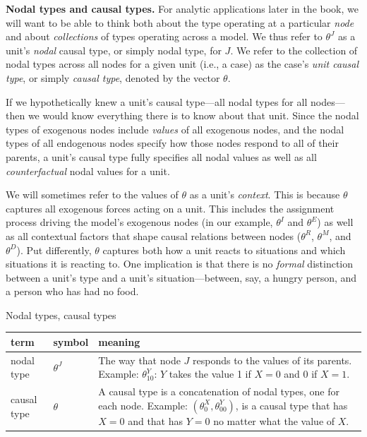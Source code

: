 \documentclass[
  12pt,
]{book}
\begin{document}
\textbf{Nodal types and causal types.} For analytic applications later in the book, we will want to be able to think both about the type operating at a particular \emph{node} and about \emph{collections} of types operating across a model. We thus refer to \(\theta^J\) as a unit's \emph{nodal} causal type, or simply nodal type, for \(J\). We refer to the collection of nodal types across all nodes for a given unit (i.e., a case) as the case's \emph{unit causal type}, or simply \emph{causal type}, denoted by the vector \(\theta\).

If we hypothetically knew a unit's causal type---all nodal types for all nodes---then we would know everything there is to know about that unit. Since the nodal types of exogenous nodes include \emph{values} of all exogenous nodes, and the nodal types of all endogenous nodes specify how those nodes respond to all of their parents, a unit's causal type fully specifies all nodal values as well as all \emph{counterfactual} nodal values for a unit.

We will sometimes refer to the values of \(\theta\) as a unit's \emph{context}. This is because \(\theta\) captures all exogenous forces acting on a unit. This includes the assignment process driving the model's exogenous nodes (in our example, \(\theta^I\) and \(\theta^E\)) as well as all contextual factors that shape causal relations between nodes (\(\theta^R\), \(\theta^M\), and \(\theta^D\)). Put differently, \(\theta\) captures both how a unit reacts to situations and which situations it is reacting to. One implication is that there is no \emph{formal} distinction between a unit's type and a unit's situation---between, say, a hungry person, and a person who has had no food.

Nodal types, causal types

\begin{longtable}[]{@{}
  >{\centering\arraybackslash}p{}
  >{\centering\arraybackslash}p{}
  >{\centering\arraybackslash}p{}@{}}
\toprule
\textbf{term} & \textbf{symbol} & \textbf{meaning} \\
\midrule
\endhead
nodal type & \(\theta^J\) & The way that node \(J\) responds to the values of its parents. Example: \(\theta^Y_{10}\): \(Y\) takes the value 1 if \(X=0\) and 0 if \(X=1\). \\
causal type & \(\theta\) & A causal type is a concatenation of nodal types, one for each node. Example: \((\theta^X_0, \theta^Y_{00})\), is a causal type that has \(X=0\) and that has \(Y=0\) no matter what the value of \(X\). \\
\bottomrule
\end{longtable}
\end{document}
